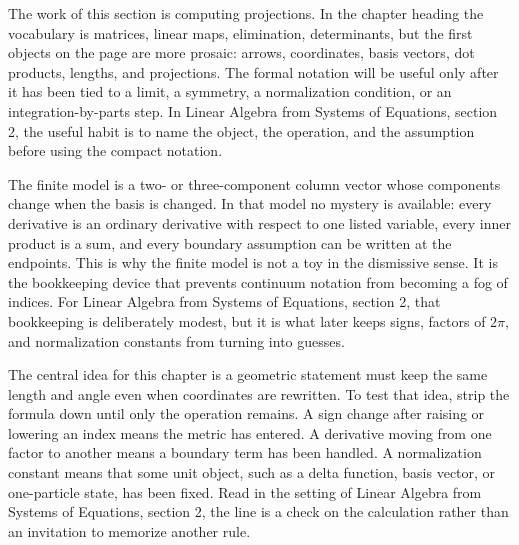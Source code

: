 











The work of this section is computing projections.  In the chapter heading the vocabulary is matrices, linear maps, elimination, determinants, but the first objects on the page are more prosaic: arrows, coordinates, basis vectors, dot products, lengths, and projections.  The formal notation will be useful only after it has been tied to a limit, a symmetry, a normalization condition, or an integration-by-parts step.  In Linear Algebra from Systems of Equations, section 2, the useful habit is to name the object, the operation, and the assumption before using the compact notation.

The finite model is a two- or three-component column vector whose components change when the basis is changed.  In that model no mystery is available: every derivative is an ordinary derivative with respect to one listed variable, every inner product is a sum, and every boundary assumption can be written at the endpoints.  This is why the finite model is not a toy in the dismissive sense.  It is the bookkeeping device that prevents continuum notation from becoming a fog of indices.  For Linear Algebra from Systems of Equations, section 2, that bookkeeping is deliberately modest, but it is what later keeps signs, factors of \(2\pi\), and normalization constants from turning into guesses.

The central idea for this chapter is a geometric statement must keep the same length and angle even when coordinates are rewritten.  To test that idea, strip the formula down until only the operation remains.  A sign change after raising or lowering an index means the metric has entered.  A derivative moving from one factor to another means a boundary term has been handled.  A normalization constant means that some unit object, such as a delta function, basis vector, or one-particle state, has been fixed.  Read in the setting of Linear Algebra from Systems of Equations, section 2, the line is a check on the calculation rather than an invitation to memorize another rule.

